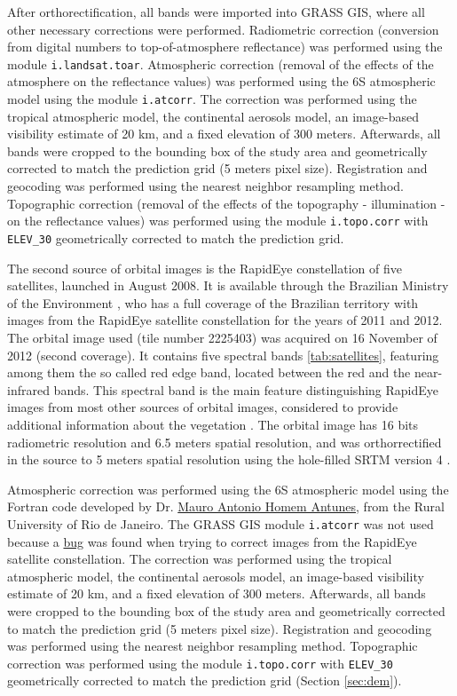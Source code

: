 After orthorectification, all bands were imported into GRASS GIS, where all other necessary corrections were performed. Radiometric correction (conversion from digital numbers to top-of-atmosphere reflectance) was performed using the module \texttt{i.landsat.toar}. Atmospheric correction (removal of the effects of the atmosphere on the reflectance values) was performed using the 6S atmospheric model \cite{VermoteEtAl1997} using the module \texttt{i.atcorr}. The correction was performed using the tropical atmospheric model, the continental aerosols model, an image-based visibility estimate of 20 km, and a fixed elevation of 300 meters. Afterwards, all bands were cropped to the bounding box of the study area and geometrically corrected to match the prediction grid (5 meters pixel size). Registration and geocoding was performed using the nearest neighbor resampling method. Topographic correction (removal of the effects of the topography - illumination - on the reflectance values) was performed using the module \texttt{i.topo.corr} with \texttt{ELEV\_30} geometrically corrected to match the prediction grid.

The second source of orbital images is the RapidEye constellation of five satellites, launched in August 2008. It is available through the Brazilian Ministry of the Environment \cite{Brasil2012}, who has a full coverage of the Brazilian territory with images from the RapidEye satellite constellation for the years of 2011 and 2012. The orbital image used (tile number 2225403) was acquired on 16 November of 2012 (second coverage). It contains five spectral bands \ref{tab:satellites}, featuring among them the so called red edge band, located between the red and the near-infrared bands. This spectral band is the main feature distinguishing RapidEye images from most other sources of orbital images, considered to provide additional information about the vegetation \cite{WeicheltEtAl2013}. The orbital image has 16 bits radiometric resolution and 6.5 meters spatial resolution, and was orthorrectified in the source to 5 meters spatial resolution using the hole-filled SRTM version 4 \cite{RapidEye2013}.

Atmospheric correction was performed using the 6S atmospheric model \cite{VermoteEtAl1997} using the Fortran code developed by Dr. \href{http://lattes.cnpq.br/3818721407909667}{Mauro Antonio Homem Antunes}, from the Rural University of Rio de Janeiro. The GRASS GIS module \texttt{i.atcorr} was not used because a \href{http://osgeo-org.1560.x6.nabble.com/i-atcorr-returns-nan-for-Landsat-5-TM-bands-1-and-2-tt5106456.html#a5118122}{bug} was found when trying to correct images from the RapidEye satellite constellation. The correction was performed using the tropical atmospheric model, the continental aerosols model, an image-based visibility estimate of 20 km, and a fixed elevation of 300 meters. Afterwards, all bands were cropped to the bounding box of the study area and geometrically corrected to match the prediction grid (5 meters pixel size). Registration and geocoding was performed using the nearest neighbor resampling method. Topographic correction was performed using the module \texttt{i.topo.corr} with \texttt{ELEV\_30} geometrically corrected to match the prediction grid (Section \ref{sec:dem}).

